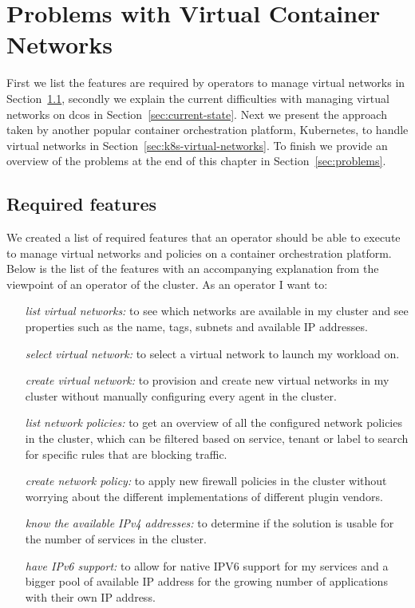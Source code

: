 \chapter{Problems with Virtual Container Networks}
\label{chap:research}
 First we list the features are required by operators to manage virtual networks in Section~\ref{sec:required-features}, secondly we explain the current difficulties with managing virtual networks on \gls{dcos} in Section~\ref{sec:current-state}. Next we present the approach taken by another popular container orchestration platform, Kubernetes, to handle virtual networks in Section~\ref{sec:k8s-virtual-networks}. To finish we provide an overview of the problems at the end of this chapter in Section~\ref{sec:problems}.

\section{Required features}
\label{sec:required-features}
 We created a list of required features that an operator should be able to execute to manage virtual networks and policies on a container orchestration platform. Below is the list of the features with an accompanying explanation from the viewpoint of an operator of the cluster. As an operator I want to:
\begin{itemize}
    \item[\textit{list virtual networks:}] to see which networks are available in my cluster and see properties such as the name, tags, subnets and available IP addresses.
    \item[\textit{select virtual network:}] to select a virtual network to launch my workload on.
    \item[\textit{create virtual network:}] to provision and create new virtual networks in my cluster without manually configuring every agent in the cluster.
    \item[\textit{list network policies:}] to get an overview of all the configured network policies in the cluster, which can be filtered based on service, tenant or label to search for specific rules that are blocking traffic.
    \item[\textit{create network policy:}] to apply new firewall policies in the cluster without worrying about the different implementations of different plugin vendors.
    \item[\textit{know the available IPv4 addresses:}] to determine if the solution is usable for the number of services in the cluster.
    \item[\textit{have IPv6 support:}] to allow for native IPV6 support for my services and a bigger pool of available IP address for the growing number of applications with their own IP address.
\end{itemize}

